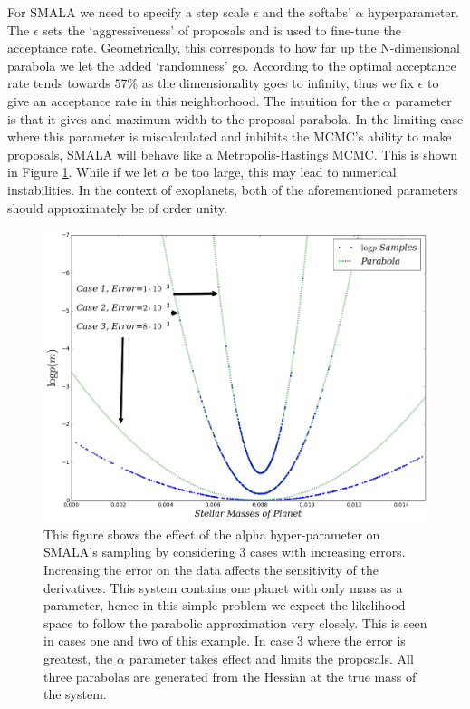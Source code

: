 \documentclass{aa}
\begin{document}
For SMALA we need to specify a step scale $\epsilon$ and the softabs' $\alpha$ hyperparameter. The $\epsilon$ sets the `aggressiveness' of proposals and is used to fine-tune the acceptance rate. Geometrically, this corresponds to how far up the N-dimensional parabola we let the added `randomness' go. According to \cite{robert1998} the optimal acceptance rate tends towards $57\%$ as the dimensionality goes to infinity, thus we fix $\epsilon$ to give an acceptance rate in this neighborhood. The intuition for the $\alpha$ parameter is that it gives and maximum width to the proposal parabola. In the limiting case where this parameter is miscalculated and inhibits the MCMC's ability to make proposals, SMALA will behave like a Metropolis-Hastings MCMC. This is shown in Figure \ref{alpha}. While if we let $\alpha$ be too large, this may lead to numerical instabilities. In the context of exoplanets, both of the aforementioned parameters should approximately be of order unity.

\begin{figure}
\centering
\includegraphics[width=0.95\hsize]{alpha-1.png}
   \caption{This figure shows the effect of the alpha hyper-parameter on SMALA's sampling by considering 3 cases with increasing errors. Increasing the error on the data affects the sensitivity of the derivatives. This system contains one planet with only mass as a parameter, hence in this simple problem we expect the likelihood space to follow the parabolic approximation very closely. This is seen in cases one and two of this example. In case 3 where the error is greatest, the $\alpha$ parameter takes effect and limits the proposals. All three parabolas are generated from the Hessian at the true mass of the system.}
      \label{alpha}
\end{figure}
\end{document}
